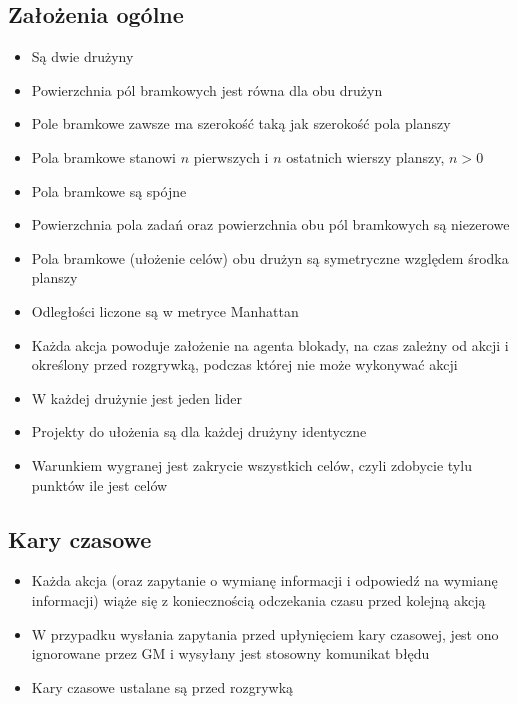 \documentclass[Dokumentacja.tex]{subfiles}
\begin{document}
\subsection{Założenia ogólne}
\begin{itemize}
    \item Są dwie drużyny
    \item Powierzchnia pól bramkowych jest równa dla obu drużyn
    \item Pole bramkowe zawsze ma szerokość taką jak szerokość pola planszy
    \item Pola bramkowe stanowi $n$ pierwszych i $n$ ostatnich wierszy planszy, $n > 0$
    \item Pola bramkowe są spójne
    \item Powierzchnia pola zadań oraz powierzchnia obu pól bramkowych są niezerowe
    \item Pola bramkowe (ułożenie celów) obu drużyn są symetryczne względem środka planszy
    \item Odległości liczone są w metryce Manhattan
    \item Każda akcja powoduje założenie na agenta blokady, na czas zależny od akcji i określony przed rozgrywką, podczas której nie może wykonywać akcji
    \item W każdej drużynie jest jeden lider
    \item Projekty do ułożenia są dla każdej drużyny identyczne
    \item Warunkiem wygranej jest zakrycie wszystkich celów, czyli zdobycie tylu punktów ile jest celów
\end{itemize}
\subsection{Kary czasowe}
\begin{itemize}
    \item Każda akcja (oraz zapytanie o wymianę informacji i odpowiedź na wymianę informacji)
    wiąże się z koniecznością odczekania czasu przed kolejną akcją
    \item W przypadku wysłania zapytania przed upłynięciem kary czasowej, jest ono ignorowane przez GM i wysyłany jest stosowny komunikat błędu
    \item Kary czasowe ustalane są przed rozgrywką
\end{itemize}
\end{document}
